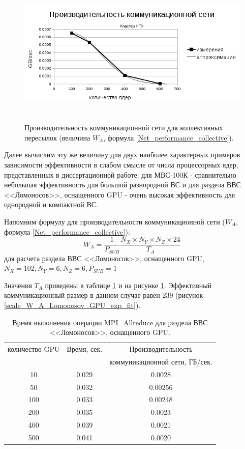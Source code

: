      
\begin{figure}[h]
	
	
	\begin{center}
		\includegraphics[height=7cm,keepaspectratio]{images/scaleNSU_exp_fit.png}
		\caption{
			Производительность коммуникационной сети для коллективных пересылок (величина $W_A$, формула \ref{Net_performance_collective}). 
		}
		\label{scale_W_A_exp}
	\end{center} 
\end{figure}

Далее вычислим эту же величину для двух наиболее характерных примеров зависимости эффективности в слабом смысле от числа процессорных ядер, представленных в диссертационной работе: для МВС-100К - сравнительно небольшая эффективность для большой разнородной ВС и для раздела ВВС <<Ломоносов>>, оснащенного GPU - очень высокая эффективность для однородной и компактной ВС. 

Напомним формулу для производительности коммуникационной сети ($W_A$, формула \ref{Net_performance_collective}):
$$
W_A = \frac{1}{P_{SUB}}\frac{N_X\times N_Y \times N_Z \times 24}{T_A}
$$
для расчета раздела ВВС <<Ломоносов>>, оснащенного GPU, $N_X = 102, N_Y = 6, N_Z = 6, P_{SUB}  = 1$

Значения $T_A$ приведены в таблице \ref{Lomonosov_GPU_W_A} и на рисунке \ref{Lomonosov_GPU_W_A}. Эффективный коммуникационный размер в данном случае равен 239 (рисунок \ref{scale_W_A_Lomonosov_GPU_exp_fit}).

\begin{table}[ht]
\caption{Время выполнения операции MPI\_Allreduce для раздела ВВС <<Ломоносов>>, оснащенного GPU.}
\begin{tabular}{|c|c|c|}
	\hline
количество GPU & Время, сек. & Производительность  \\
               &             & коммуникационной сети, ГБ/сек. \\\hline
 10           & 0.029       & 0.0028\\
 50           & 0.032       & 0.00256\\
 100          & 0.033       & 0.00248\\
 200          & 0.035       & 0.0023\\
 400          & 0.039       & 0.0021\\
 500          & 0.041       & 0.0020\\	
\hline
\end{tabular}
\label{Lomonosov_GPU_W_A}
\end{table} 

